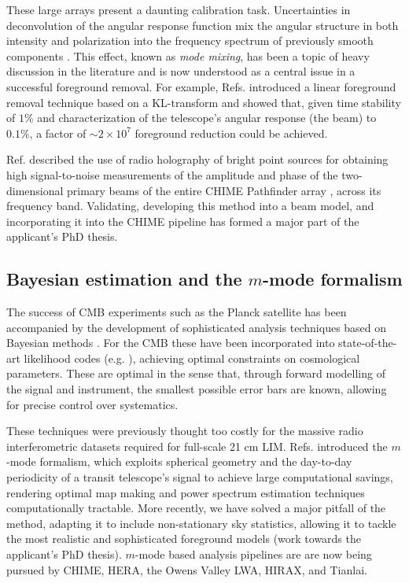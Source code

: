 These large arrays present a daunting calibration task. Uncertainties in deconvolution of the angular response function mix the angular structure in both intensity and polarization into the frequency spectrum of previously smooth components \cite{wedge1}. This effect, known as \textit{mode mixing}, has been a topic of heavy discussion in the literature and is now understood as a central issue in a successful foreground removal. For example, Refs. \cite{mmodes1, mmodes2} introduced a linear foreground removal technique based on a KL-transform and showed that, given time stability of $1\%$ and characterization of the telescope's angular response (the beam) to $0.1\%$, a factor of $\sim2\times 10^7$ foreground reduction could be achieved. 

Ref. \cite{bergernewburgh} described the use of radio holography of bright point sources for obtaining high signal-to-noise measurements of the amplitude and phase of the two-dimensional primary beams of the entire CHIME Pathfinder array \cite{chimepf1}, across its frequency band. Validating, developing this method into a beam model, and incorporating it into the CHIME pipeline has formed a major part of the applicant's PhD thesis. 

\subsection{\label{sec:bg:subsec:mmodes} Bayesian estimation and the $m$-mode formalism}

The success of CMB experiments such as the Planck satellite has been accompanied by the development of sophisticated analysis techniques based on Bayesian methods \cite{bondjaffeknox}. For the CMB these have been incorporated into state-of-the-art likelihood codes (e.g. \cite{commander}), achieving optimal constraints on cosmological parameters. These are optimal in the sense that, through forward modelling of the signal and instrument, the smallest possible error bars are known, allowing for precise control over systematics.

These techniques were previously thought too costly for the massive radio interferometric datasets required for full-scale 21 cm LIM. Refs. \cite{mmodes1, mmodes2} introduced the $m$-mode formalism, which exploits spherical geometry and the day-to-day periodicity of a transit telescope's signal to achieve large computational savings, rendering optimal map making and power spectrum estimation techniques computationally tractable. More recently, we have solved a major pitfall of the method, adapting it to include non-stationary sky statistics, allowing it to tackle the most realistic and sophisticated foreground models \cite{bergeroppermann} (work towards the applicant's PhD thesis). $m$-mode based analysis pipelines are are now being pursued by CHIME, HERA, the Owens Valley LWA, HIRAX, and Tianlai.